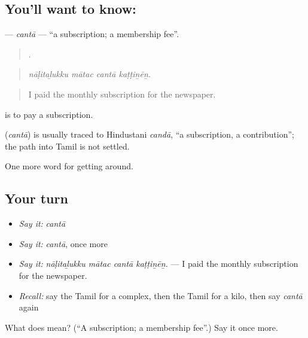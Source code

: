 \subsection*{You'll want to know: }
\textbf{} — \emph{cantā} — \textquotedblleft{}a subscription; a membership fee\textquotedblright{}.

\begin{quote}
   .
\end{quote}

\begin{quote}
\emph{nāḷitaḻukku mātac cantā kaṭṭiṉēṉ.}
\end{quote}

\begin{quote}
I paid the monthly subscription for the newspaper.
\end{quote}

  is to pay a subscription.

\begin{cousinweb}
\textbf{} (\emph{cantā}) is usually traced to Hindustani \emph{candā}, \textquotedblleft{}a subscription, a contribution\textquotedblright{}; the path into Tamil is not settled.
\end{cousinweb}

\begin{grammarlens}[title={What you've built}]
One more word for getting around.
\end{grammarlens}

\subsection*{Your turn}
\begin{itemize}
\raggedright
  \item \emph{Say it:} \emph{cantā}
  \item \emph{Say it:} \emph{cantā}, once more
  \item \emph{Say it:} \emph{nāḷitaḻukku mātac cantā kaṭṭiṉēṉ.} — I paid the monthly subscription for the newspaper.
  \item \emph{Recall:} say the Tamil for a complex, then the Tamil for a kilo, then say \emph{cantā} again
\end{itemize}

\begin{tcolorbox}[breakable,colback=teal!4,colframe=teal!35!black,title={Before you move on}]
What does  mean? (\textquotedblleft{}A subscription; a membership fee\textquotedblright{}.) Say it once more.
\end{tcolorbox}
